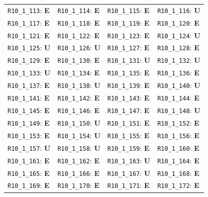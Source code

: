 \begin{longtable}{llll}
\texttt{R10\_1\_113}: \textbf{E} & \texttt{R10\_1\_114}: \textbf{E} & \texttt{R10\_1\_115}: \textbf{E} & \texttt{R10\_1\_116}: \textbf{U} \\
\texttt{R10\_1\_117}: \textbf{E} & \texttt{R10\_1\_118}: \textbf{E} & \texttt{R10\_1\_119}: \textbf{E} & \texttt{R10\_1\_120}: \textbf{E} \\
\texttt{R10\_1\_121}: \textbf{E} & \texttt{R10\_1\_122}: \textbf{E} & \texttt{R10\_1\_123}: \textbf{E} & \texttt{R10\_1\_124}: \textbf{U} \\
\texttt{R10\_1\_125}: \textbf{U} & \texttt{R10\_1\_126}: \textbf{U} & \texttt{R10\_1\_127}: \textbf{E} & \texttt{R10\_1\_128}: \textbf{E} \\
\texttt{R10\_1\_129}: \textbf{E} & \texttt{R10\_1\_130}: \textbf{E} & \texttt{R10\_1\_131}: \textbf{U} & \texttt{R10\_1\_132}: \textbf{U} \\
\texttt{R10\_1\_133}: \textbf{U} & \texttt{R10\_1\_134}: \textbf{E} & \texttt{R10\_1\_135}: \textbf{E} & \texttt{R10\_1\_136}: \textbf{E} \\
\texttt{R10\_1\_137}: \textbf{E} & \texttt{R10\_1\_138}: \textbf{U} & \texttt{R10\_1\_139}: \textbf{E} & \texttt{R10\_1\_140}: \textbf{U} \\
\texttt{R10\_1\_141}: \textbf{E} & \texttt{R10\_1\_142}: \textbf{E} & \texttt{R10\_1\_143}: \textbf{E} & \texttt{R10\_1\_144}: \textbf{E} \\
\texttt{R10\_1\_145}: \textbf{E} & \texttt{R10\_1\_146}: \textbf{E} & \texttt{R10\_1\_147}: \textbf{E} & \texttt{R10\_1\_148}: \textbf{U} \\
\texttt{R10\_1\_149}: \textbf{E} & \texttt{R10\_1\_150}: \textbf{U} & \texttt{R10\_1\_151}: \textbf{E} & \texttt{R10\_1\_152}: \textbf{E} \\
\texttt{R10\_1\_153}: \textbf{E} & \texttt{R10\_1\_154}: \textbf{U} & \texttt{R10\_1\_155}: \textbf{E} & \texttt{R10\_1\_156}: \textbf{E} \\
\texttt{R10\_1\_157}: \textbf{U} & \texttt{R10\_1\_158}: \textbf{U} & \texttt{R10\_1\_159}: \textbf{E} & \texttt{R10\_1\_160}: \textbf{E} \\
\texttt{R10\_1\_161}: \textbf{E} & \texttt{R10\_1\_162}: \textbf{E} & \texttt{R10\_1\_163}: \textbf{U} & \texttt{R10\_1\_164}: \textbf{E} \\
\texttt{R10\_1\_165}: \textbf{E} & \texttt{R10\_1\_166}: \textbf{E} & \texttt{R10\_1\_167}: \textbf{U} & \texttt{R10\_1\_168}: \textbf{E} \\
\texttt{R10\_1\_169}: \textbf{E} & \texttt{R10\_1\_170}: \textbf{E} & \texttt{R10\_1\_171}: \textbf{E} & \texttt{R10\_1\_172}: \textbf{E} \\

\end{longtable}
